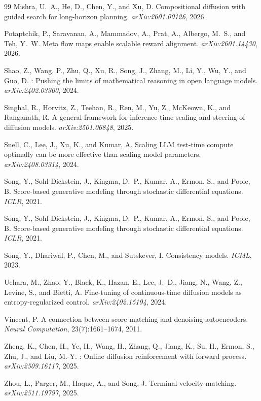 \documentclass[11pt]{article}
\begin{document}
\begin{thebibliography}{99}
Mishra, U.~A., He, D., Chen, Y., and Xu, D.
\newblock Compositional diffusion with guided search for long-horizon planning.
\newblock \emph{arXiv:2601.00126}, 2026.

Potaptchik, P., Saravanan, A., Mammadov, A., Prat, A., Albergo, M.~S., and Teh, Y.~W.
\newblock Meta flow maps enable scalable reward alignment.
\newblock \emph{arXiv:2601.14430}, 2026.

Shao, Z., Wang, P., Zhu, Q., Xu, R., Song, J., Zhang, M., Li, Y., Wu, Y., and Guo, D.
: Pushing the limits of mathematical reasoning in open language models.
\newblock \emph{arXiv:2402.03300}, 2024.

Singhal, R., Horvitz, Z., Teehan, R., Ren, M., Yu, Z., McKeown, K., and Ranganath, R.
\newblock A general framework for inference-time scaling and steering of diffusion models.
\newblock \emph{arXiv:2501.06848}, 2025.

Snell, C., Lee, J., Xu, K., and Kumar, A.
\newblock Scaling {LLM} test-time compute optimally can be more effective than scaling model parameters.
\newblock \emph{arXiv:2408.03314}, 2024.

Song, Y., Sohl-Dickstein, J., Kingma, D.~P., Kumar, A., Ermon, S., and Poole, B.
\newblock Score-based generative modeling through stochastic differential equations.
\newblock \emph{ICLR}, 2021.

Song, Y., Sohl-Dickstein, J., Kingma, D.~P., Kumar, A., Ermon, S., and Poole, B.
\newblock Score-based generative modeling through stochastic differential equations.
\newblock \emph{ICLR}, 2021.

Song, Y., Dhariwal, P., Chen, M., and Sutskever, I.
\newblock Consistency models.
\newblock \emph{ICML}, 2023.

Uehara, M., Zhao, Y., Black, K., Hazan, E., Lee, J.~D., Jiang, N., Wang, Z., Levine, S., and Bietti, A.
\newblock Fine-tuning of continuous-time diffusion models as entropy-regularized control.
\newblock \emph{arXiv:2402.15194}, 2024.

Vincent, P.
\newblock A connection between score matching and denoising autoencoders.
\newblock \emph{Neural Computation}, 23(7):1661--1674, 2011.

Zheng, K., Chen, H., Ye, H., Wang, H., Zhang, Q., Jiang, K., Su, H., Ermon, S., Zhu, J., and Liu, M.-Y.
: Online diffusion reinforcement with forward process.
\newblock \emph{arXiv:2509.16117}, 2025.

Zhou, L., Parger, M., Haque, A., and Song, J.
\newblock Terminal velocity matching.
\newblock \emph{arXiv:2511.19797}, 2025.

\end{thebibliography}
\end{document}
